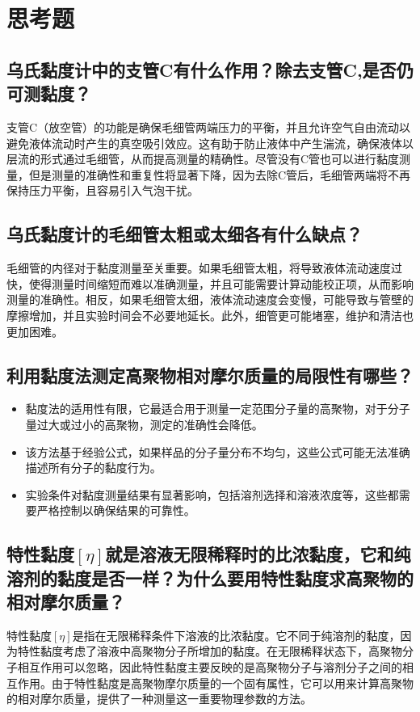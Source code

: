 \documentclass[12pt,hyperref,a4paper,UTF8]{ctexart}
\begin{document}
\section{思考题}

\subsection{乌氏黏度计中的支管C有什么作用？除去支管C,是否仍可测黏度？}

支管C（放空管）的功能是确保毛细管两端压力的平衡，并且允许空气自由流动以避免液体流动时产生的真空吸引效应。这有助于防止液体中产生湍流，确保液体以层流的形式通过毛细管，从而提高测量的精确性。尽管没有C管也可以进行黏度测量，但是测量的准确性和重复性将显著下降，因为去除C管后，毛细管两端将不再保持压力平衡，且容易引入气泡干扰。

\subsection{乌氏黏度计的毛细管太粗或太细各有什么缺点？}

毛细管的内径对于黏度测量至关重要。如果毛细管太粗，将导致液体流动速度过快，使得测量时间缩短而难以准确测量，并且可能需要计算动能校正项，从而影响测量的准确性。相反，如果毛细管太细，液体流动速度会变慢，可能导致与管壁的摩擦增加，并且实验时间会不必要地延长。此外，细管更可能堵塞，维护和清洁也更加困难。

\subsection{利用黏度法测定高聚物相对摩尔质量的局限性有哪些？}

\begin{itemize}
	\item 黏度法的适用性有限，它最适合用于测量一定范围分子量的高聚物，对于分子量过大或过小的高聚物，测定的准确性会降低。
	\item 该方法基于经验公式，如果样品的分子量分布不均匀，这些公式可能无法准确描述所有分子的黏度行为。
	\item 实验条件对黏度测量结果有显著影响，包括溶剂选择和溶液浓度等，这些都需要严格控制以确保结果的可靠性。
\end{itemize}

\subsection{特性黏度$[\eta]$就是溶液无限稀释时的比浓黏度，它和纯溶剂的黏度是否一样？为什么要用特性黏度求高聚物的相对摩尔质量？}

特性黏度$[\eta]$是指在无限稀释条件下溶液的比浓黏度。它不同于纯溶剂的黏度，因为特性黏度考虑了溶液中高聚物分子所增加的黏度。在无限稀释状态下，高聚物分子相互作用可以忽略，因此特性黏度主要反映的是高聚物分子与溶剂分子之间的相互作用。由于特性黏度是高聚物摩尔质量的一个固有属性，它可以用来计算高聚物的相对摩尔质量，提供了一种测量这一重要物理参数的方法。




\end{document}
